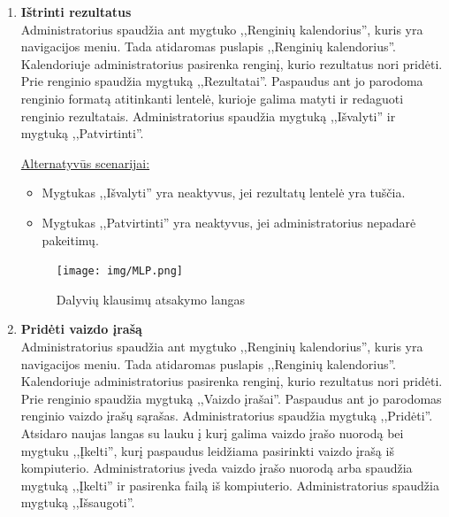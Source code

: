 \documentclass{VUMIFPSkursinis}
\begin{document}
\begin{enumerate} [label = \textbf{U\arabic*.}]
					\underline{Alternatyvūs scenarijai:}
					\begin{itemize}
						\item Metamos klaidos, jei rezultatai yra vedami neteisingai (pvz.: kai į skaitinius laukus bandomos įvesti raidės).
						\item Mygtukas ,,Patvirtinti'' yra neaktyvus, jei administratorius nepadarė pakeitimų.
					\end{itemize}
				
				\begin{figure}[H]
					\centering
					\texttt{[image: img/MLP.png]}
					\caption{Dalyvių klausimų atsakymo langas}
					\label{fig:atsakyti-klausimus}
				\end{figure}
				
			\item \textbf{Ištrinti rezultatus}   \\
					Administratorius spaudžia ant mygtuko ,,Renginių kalendorius'', kuris yra navigacijos meniu. Tada atidaromas puslapis ,,Renginių kalendorius''. Kalendoriuje administratorius pasirenka renginį, kurio rezultatus nori pridėti. Prie renginio spaudžia mygtuką ,,Rezultatai''. Paspaudus ant jo parodoma renginio formatą atitinkanti lentelė, kurioje galima matyti ir redaguoti renginio rezultatais. Administratorius spaudžia mygtuką ,,Išvalyti'' ir mygtuką ,,Patvirtinti''.
					
					\underline{Alternatyvūs scenarijai:}
					\begin{itemize}
						\item Mygtukas ,,Išvalyti'' yra neaktyvus, jei rezultatų lentelė yra tuščia.
						\item Mygtukas ,,Patvirtinti'' yra neaktyvus, jei administratorius nepadarė pakeitimų.
					\end{itemize}
				
				\begin{figure}[H]
					\centering
					\texttt{[image: img/MLP.png]}
					\caption{Dalyvių klausimų atsakymo langas}
					\label{fig:atsakyti-klausimus}
				\end{figure}
				
			\item \textbf{Pridėti vaizdo įrašą}   \\
					Administratorius spaudžia ant mygtuko ,,Renginių kalendorius'', kuris yra navigacijos meniu. Tada atidaromas puslapis ,,Renginių kalendorius''. Kalendoriuje administratorius pasirenka renginį, kurio rezultatus nori pridėti. Prie renginio spaudžia mygtuką ,,Vaizdo įrašai''. Paspaudus ant jo parodomas renginio vaizdo įrašų sąrašas. Administratorius spaudžia mygtuką ,,Pridėti''. Atsidaro naujas langas su lauku į kurį galima vaizdo įrašo nuorodą bei mygtuku ,,Įkelti'', kurį paspaudus leidžiama pasirinkti vaizdo įrašą iš kompiuterio. Administratorius įveda vaizdo įrašo nuorodą arba spaudžia mygtuką ,,Įkelti'' ir pasirenka failą iš kompiuterio. Administratorius spaudžia mygtuką ,,Išsaugoti''.
					

\end{enumerate}
\end{document}
